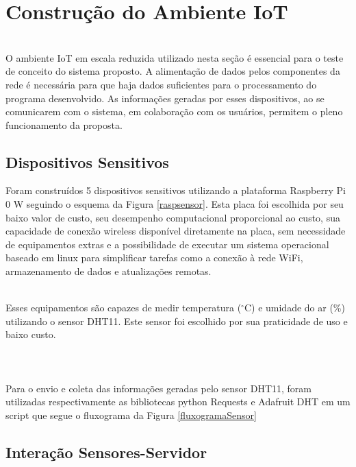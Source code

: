 \section{Construção do Ambiente IoT}
\\\null \quad O ambiente \acrshort{IoT} em escala reduzida utilizado nesta seção é essencial para o teste de conceito
do sistema proposto. A alimentação de dados pelos componentes da rede é necessária para que haja
dados suficientes para o processamento do programa desenvolvido. As informações geradas por esses dispositivos, ao se comunicarem com o sistema, em colaboração
com os usuários, permitem o pleno funcionamento da proposta.

\subsection{Dispositivos Sensitivos}
\quad Foram construídos 5 dispositivos sensitivos utilizando a plataforma Raspberry Pi 0 W seguindo o esquema da Figura \ref{raspsensor}. Esta placa
foi escolhida por seu baixo valor de custo, seu desempenho computacional proporcional ao custo, sua capacidade de conexão wireless disponível diretamente na placa, sem necessidade de equipamentos extras e a possibilidade de executar um sistema operacional baseado em linux para simplificar tarefas como a conexão à rede WiFi, armazenamento de dados e atualizações remotas.

\\\null \quad Esses equipamentos são capazes de medir temperatura ($^\circ$C) e umidade do ar (\%) utilizando o sensor DHT11. Este sensor foi escolhido
por sua praticidade de uso e baixo custo.
\\\\\\
\\\null \quad Para o envio e coleta das informações geradas pelo sensor DHT11, foram utilizadas respectivamente as bibliotecas python Requests \cite{Requests} e Adafruit DHT \cite{AdafruitDHT} em um script que segue o fluxograma da Figura \ref{fluxogramaSensor}

\newpage
\subsection{Interação Sensores-Servidor}

